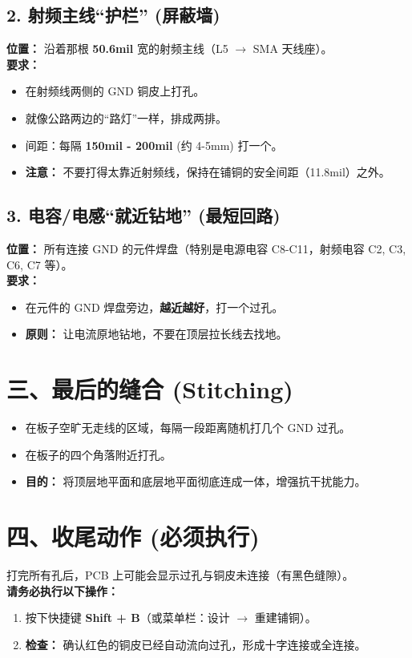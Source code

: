 \documentclass[a4paper,12pt]{article}
\begin{document}
	\subsection{2. 射频主线“护栏” (屏蔽墙)}
	\textbf{位置：} 沿着那根 \textbf{50.6mil} 宽的射频主线（L5 $\rightarrow$ SMA 天线座）。\\
	\textbf{要求：}
	\begin{itemize}
		\item 在射频线两侧的 GND 铜皮上打孔。
		\item 就像公路两边的“路灯”一样，排成两排。
		\item 间距：每隔 \textbf{150mil - 200mil} (约 4-5mm) 打一个。
		\item \textbf{注意：} 不要打得太靠近射频线，保持在铺铜的安全间距（11.8mil）之外。
	\end{itemize}

	\subsection{3. 电容/电感“就近钻地” (最短回路)}
	\textbf{位置：} 所有连接 GND 的元件焊盘（特别是电源电容 C8-C11，射频电容 C2, C3, C6, C7 等）。\\
	\textbf{要求：}
	\begin{itemize}
		\item 在元件的 GND 焊盘旁边，\textbf{越近越好}，打一个过孔。
		\item \textbf{原则：} 让电流原地钻地，不要在顶层拉长线去找地。
	\end{itemize}

	\section{三、最后的缝合 (Stitching)}
	\begin{itemize}
		\item 在板子空旷无走线的区域，每隔一段距离随机打几个 GND 过孔。
		\item 在板子的四个角落附近打孔。
		\item \textbf{目的：} 将顶层地平面和底层地平面彻底连成一体，增强抗干扰能力。
	\end{itemize}

	\section{四、收尾动作 (必须执行)}
	打完所有孔后，PCB 上可能会显示过孔与铜皮未连接（有黑色缝隙）。\\
	\textbf{请务必执行以下操作：}
	\begin{enumerate}
		\item 按下快捷键 \textbf{Shift + B}（或菜单栏：设计 $\rightarrow$ 重建铺铜）。
		\item \textbf{检查：} 确认红色的铜皮已经自动流向过孔，形成十字连接或全连接。
	\end{enumerate}
\end{document}
